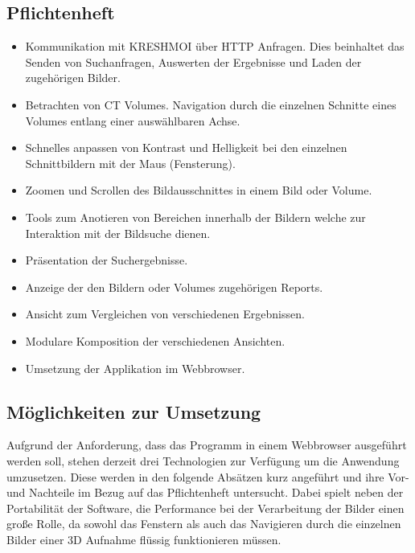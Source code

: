 \subsection{Pflichtenheft}
\label{sec:Pflichtenheft}
\begin{itemize}
	\item Kommunikation mit KRESHMOI über HTTP Anfragen. Dies beinhaltet das Senden von Suchanfragen, Auswerten der Ergebnisse und Laden der zugehörigen Bilder.
	\item Betrachten von CT Volumes. Navigation durch die einzelnen Schnitte eines Volumes entlang einer auswählbaren Achse.
	\item Schnelles anpassen von Kontrast und Helligkeit bei den einzelnen Schnittbildern mit der Maus (Fensterung).
	\item Zoomen und Scrollen des Bildausschnittes in einem Bild oder Volume.
	\item Tools zum Anotieren von Bereichen innerhalb der Bildern welche zur Interaktion mit der Bildsuche dienen.
	\item Präsentation der Suchergebnisse.
	\item Anzeige der den Bildern oder Volumes zugehörigen Reports.
	\item Ansicht zum Vergleichen von verschiedenen Ergebnissen.
	\item Modulare Komposition der verschiedenen Ansichten.
	\item Umsetzung der Applikation im Webbrowser.
\end{itemize}

\subsection{Möglichkeiten zur Umsetzung}
\label{sec:Möglichkeiten zur Umsetzung}
Aufgrund der Anforderung, dass das Programm in einem Webbrowser ausgeführt werden soll, stehen derzeit drei Technologien zur Verfügung um die Anwendung umzusetzen.
Diese werden in den folgende Absätzen kurz angeführt und ihre Vor- und Nachteile im Bezug auf das Pflichtenheft untersucht.
Dabei spielt neben der Portabilität der Software, 
die Performance bei der Verarbeitung der Bilder einen große Rolle, da sowohl das Fenstern als auch das Navigieren durch die einzelnen Bilder einer 3D Aufnahme flüssig funktionieren müssen.


